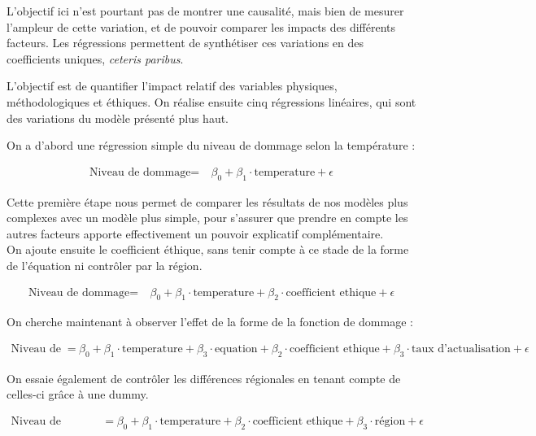 L'objectif ici n'est pourtant pas de montrer une causalité, mais bien de mesurer l'ampleur de cette variation, et de pouvoir comparer les impacts des différents facteurs. Les régressions permettent de synthétiser ces variations en des coefficients uniques, \emph{ceteris paribus}.

L'objectif est de quantifier l'impact relatif des variables physiques, méthodologiques et éthiques. On réalise ensuite cinq régressions linéaires, qui sont des variations du modèle présenté plus haut. 


On a d'abord une régression simple du niveau de dommage selon la température : 

\begin{align}
\text{Niveau de dommage} = & \ \beta_0  + \beta_1 \cdot \text{temperature}  + \epsilon
\end{align}

Cette première étape nous permet de comparer les résultats de nos modèles plus complexes avec un modèle plus simple, pour s'assurer que prendre en compte les autres facteurs apporte effectivement un pouvoir explicatif complémentaire.  \\

On ajoute ensuite le coefficient éthique, sans tenir compte à ce stade de la forme de l'équation ni contrôler par la région. 

\begin{align}
\text{Niveau de dommage} = & \ \beta_0  + \beta_1 \cdot \text{temperature}  + \beta_2 \cdot \text{coefficient ethique} + \epsilon
\end{align}

On cherche maintenant à observer l'effet de la forme de la fonction de dommage : 

\begin{align}
\text{Niveau de dommage} = & \ \beta_0  + \beta_1 \cdot \text{temperature}  + \beta_3 \cdot \text{equation} + 
 \beta_2 \cdot \text{coefficient ethique} + \beta_3 \cdot \text{taux d'actualisation}  + \epsilon
\end{align}

On essaie également de contrôler les différences régionales en tenant compte de celles-ci grâce à une dummy. 

\begin{align}
\text{Niveau de dommage} = & \ \beta_0  + \beta_1 \cdot \text{temperature}  + \beta_2 \cdot \text{coefficient ethique} + \beta_3 \cdot \text{région} + \epsilon
\end{align}

